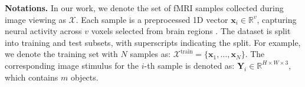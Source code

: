 \textbf{Notations. } 
In our work, we denote the set of fMRI samples collected during image viewing as $\mathcal{X}$. Each sample is a preprocessed 1D vector $\mathbf{x}_i \in \mathbb{R}^v$, capturing neural activity across $v$ voxels selected from brain regions \citep{scotti2023reconstructing}. The dataset is split into training and test subsets, with superscripts indicating the split. For example, we denote the training set with $N$ samples as: $\mathcal{X}^{\text{train}} = \{\mathbf{x}_1, \ldots, \mathbf{x}_N\}$. The corresponding image stimulus for the $i$-th sample is denoted as: $\mathbf{Y}_i \in \mathbb{R}^{H \times W \times 3}$, which contains $m$ objects. 

